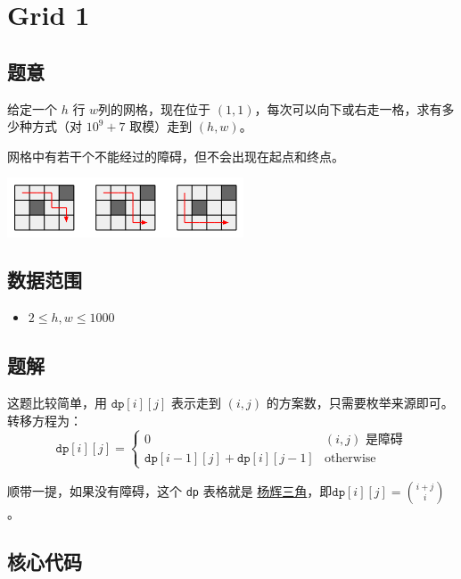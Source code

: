 \section{Grid 1}
\subsection*{题意}
给定一个 $h$ 行 $w$列的网格，现在位于 $(1,1)$，每次可以向下或右走一格，求有多少种方式（对 $10^9 + 7$ 取模）走到 $(h,w)$。

网格中有若干个不能经过的障碍，但不会出现在起点和终点。
\begin{center}
\includegraphics[width=7cm]{./Pics/grid.png}
\end{center}
\subsection*{数据范围}
\begin{itemize}
\item $2 \leq h,w \leq 1000$
\end{itemize}
\subsection*{题解}

这题比较简单，用 ${\texttt{dp}[i][j]}$ 表示走到 $(i,j)$ 的方案数，只需要枚举来源即可。转移方程为：
\begin{equation*}
{\texttt{dp}[i][j]} = 
\begin{cases}
 0 & (i,j)\text{ 是障碍}\\
 {\texttt{dp}[i-1][j]} + {\texttt{dp}[i][j-1]} & \text{otherwise}
\end{cases}
\end{equation*}


顺带一提，如果没有障碍，这个 \texttt{dp} 表格就是 \href{https://zh.wikipedia.org/zh-hans/%E6%9D%A8%E8%BE%89%E4%B8%89%E8%A7%92%E5%BD%A2}{杨辉三角}，即${\texttt{dp}[i][j]} = {\binom{i+j}{i}}$ 。



\subsection*{核心代码}
\inputminted[linenos,autogobble]{cpp}{./Code/H.cpp}
\newpage